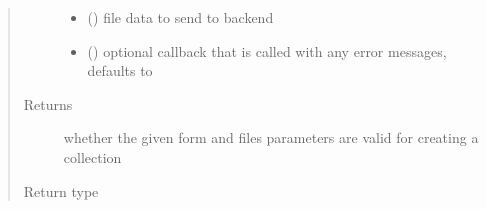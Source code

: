 \documentclass[letterpaper,10pt,english]{sphinxmanual}
\begin{document}
\begin{fulllineitems}
\begin{quote}
\begin{description}
\begin{itemize}
\item {} 
 () \textendash{} file data to send to backend

\item {} 
 (\sphinxstyleliteralemphasis{\sphinxupquote{, }}) \textendash{} optional callback that is called with any error messages, defaults to 

\end{itemize}

\item[{Returns}] \leavevmode
whether the given form and files parameters are valid for creating a collection

\item[{Return type}] \leavevmode
{}

\end{description}\end{quote}

\end{fulllineitems}

\end{document}
